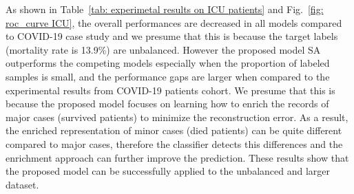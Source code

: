 As shown in Table~\ref{tab: experimetal results on ICU patients} and Fig.~\ref{fig: roc_curve ICU}, the overall performances are decreased in all models compared to COVID-19 case study and we presume that this is because the target labels (mortality rate is 13.9\%) are unbalanced. However the proposed model SA outperforms the competing models especially when the proportion of labeled samples is small, and the performance gaps are larger when compared to the experimental results from COVID-19 patients cohort. We presume that this is because the proposed model focuses on learning how to enrich the records of major cases (survived patients) to minimize the reconstruction error. As a result, the enriched representation of minor cases (died patients) can be quite different compared to major cases, therefore the classifier detects this differences and the enrichment approach can further improve the prediction. These results show that the proposed model can be successfully applied to the unbalanced and larger dataset.


